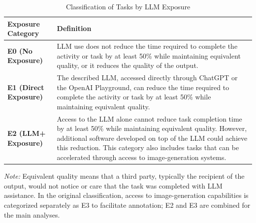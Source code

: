 \begin{table}[H]
  \centering
  \caption{Classification of Tasks by LLM Exposure \citep{eloundou2023gptsgptsearlylook}}
  \label{tab:llm_exposure}
  \begin{tabular}{@{}p{} p{}@{}}
    \toprule
    \textbf{Exposure Category} & \textbf{Definition}                                                                                                                                                                                                                                                                                            \\
    \midrule
    \textbf{E0 (No Exposure)}
                               & LLM use does not reduce the time required to complete the activity or task by at least 50\% while maintaining equivalent quality, or it reduces the quality of the output.                                                                                                                                     \\[0.4em]

    \textbf{E1 (Direct Exposure)}
                               & The described LLM, accessed directly through ChatGPT or the OpenAI Playground, can reduce the time required to complete the activity or task by at least 50\% while maintaining equivalent quality.                                                                                                            \\[0.4em]

    \textbf{E2 (LLM+ Exposure)}
                               & Access to the LLM alone cannot reduce task completion time by at least 50\% while maintaining equivalent quality. However, additional software developed on top of the LLM could achieve this reduction. This category also includes tasks that can be accelerated through access to image-generation systems. \\
    \bottomrule
  \end{tabular}

  \vspace{0.3em}
  \begin{minipage}{0.95\textwidth}
    \footnotesize
    \textit{Note:} Equivalent quality means that a third party, typically the recipient of the output, would not notice or care that the task was completed with LLM assistance. In the original classification, access to image-generation capabilities is categorized separately as E3 to facilitate annotation; E2 and E3 are combined for the main analyses.
  \end{minipage}
\end{table}


